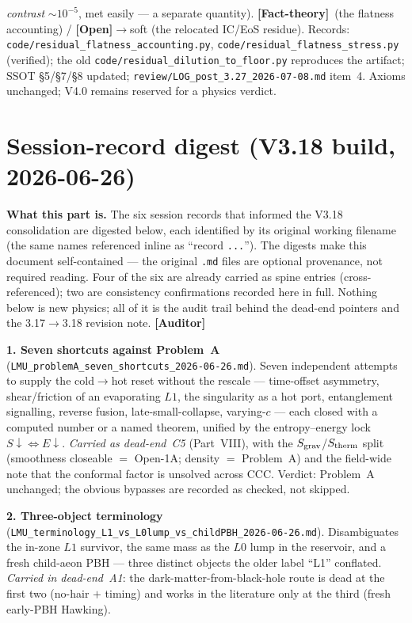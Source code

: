\documentclass[11pt]{article}
\newcommand{\Auditor}{\textbf{\textcolor{teal!55!black}{[Auditor]}}}
\newcommand{\factth}{\textcolor{green!40!black}{\textbf{[Fact-theory]}}}
\newcommand{\open}{\textcolor{red!70!black}{\textbf{[Open]}}}
\begin{document}
{\emph{contrast} $\sim\!10^{-5}$, met easily --- a separate quantity). \factth\ (the flatness accounting) / \open$\to$soft (the relocated IC/EoS residue). Records: \texttt{code/residual\_flatness\_accounting.py}, \texttt{code/residual\_flatness\_stress.py} (verified); the old \texttt{code/residual\_dilution\_to\_floor.py} reproduces the artifact; SSOT \S5/\S7/\S8 updated; \texttt{review/LOG\_post\_3.27\_2026-07-08.md} item~4. Axioms unchanged; V4.0 remains reserved for a physics verdict.

}

\part{Session-record digest (V3.18 build, 2026-06-26)}
\noindent\textbf{What this part is.} The six session records that informed the V3.18 consolidation are digested below, each identified by its original working filename (the same names referenced inline as ``record \texttt{...}''). The digests make this document self-contained --- the original \texttt{.md} files are optional provenance, not required reading. Four of the six are already carried as spine entries (cross-referenced); two are consistency confirmations recorded here in full. Nothing below is new physics; all of it is the audit trail behind the dead-end pointers and the 3.17$\to$3.18 revision note. \Auditor

\smallskip\noindent\textbf{1. Seven shortcuts against Problem~A} (\texttt{LMU\_problemA\_seven\_shortcuts\_2026-06-26.md}). Seven independent attempts to supply the cold$\to$hot reset without the rescale --- time-offset asymmetry, shear/friction of an evaporating $L1$, the singularity as a hot port, entanglement signalling, reverse fusion, late-small-collapse, varying-$c$ --- each closed with a computed number or a named theorem, unified by the entropy--energy lock $S\!\downarrow\Leftrightarrow E\!\downarrow$. \emph{Carried as dead-end~C5} (Part~VIII), with the $S_{\rm grav}$/$S_{\rm therm}$ split (smoothness closeable $=$ Open-1A; density $=$ Problem~A) and the field-wide note that the conformal factor is unsolved across CCC. Verdict: Problem~A unchanged; the obvious bypasses are recorded as checked, not skipped.

\smallskip\noindent\textbf{2. Three-object terminology} (\texttt{LMU\_terminology\_L1\_vs\_L0lump\_vs\_childPBH\_2026-06-26.md}). Disambiguates the in-zone $L1$ survivor, the same mass as the $L0$ lump in the reservoir, and a fresh child-aeon PBH --- three distinct objects the older label ``L1'' conflated. \emph{Carried in dead-end~A1}: the dark-matter-from-black-hole route is dead at the first two (no-hair $+$ timing) and works in the literature only at the third (fresh early-PBH Hawking).
\end{document}
